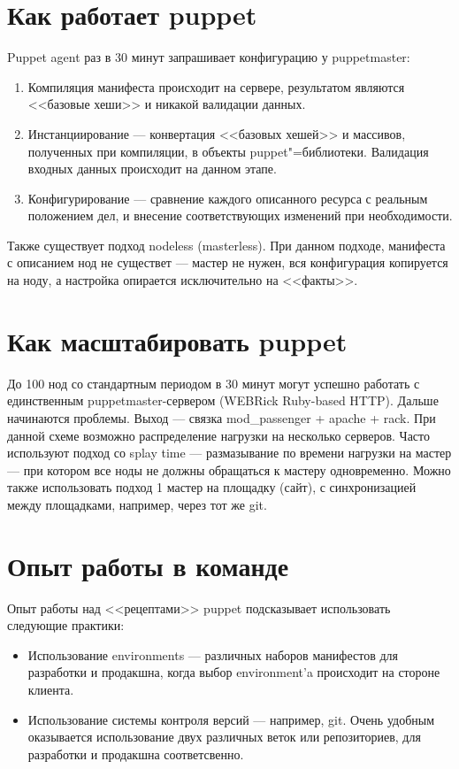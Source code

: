 \documentclass[10pt, a5paper]{article}
\begin{document}
\section*{Как работает puppet}

Puppet agent раз в 30 минут запрашивает конфигурацию у puppetmaster:

\begin{enumerate}
  \item Компиляция манифеста происходит на сервере, результатом являются <<базовые хеши>> и никакой валидации данных.
  \item Инстанциирование --- конвертация <<базовых хешей>> и массивов, полученных при компиляции, в объекты puppet"=библиотеки. Валидация входных данных происходит на данном этапе.
  \item Конфигурирование --- сравнение каждого описанного ресурса с реальным положением дел, и внесение соответствующих изменений при необходимости.
\end{enumerate}

Также существует подход nodeless (masterless). При данном подходе, манифеста с описанием нод не существет --- мастер не нужен, вся конфигурация копируется на ноду, а настройка опирается исключительно на <<факты>>.

\section*{Как масштабировать puppet}

До 100 нод со стандартным периодом в 30 минут могут успешно работать с единственным puppetmaster-сервером (WEBRick Ruby-based HTTP). Дальше начинаются проблемы. Выход --- связка mod\_passenger + apache + rack. При данной схеме возможно распределение нагрузки на несколько серверов. Часто используют подход со splay time --- размазывание по времени нагрузки на мастер --- при котором все ноды не должны обращаться к мастеру одновременно. Можно также использовать подход 1 мастер на площадку (сайт), с синхронизацией между площадками, например, через тот же git.

\section*{Опыт работы в команде}

Опыт работы над <<рецептами>> puppet подсказывает использовать следующие практики:

\begin{itemize}
  \item Использование environments --- различных наборов манифестов для разработки и продакшна, когда выбор environment’a происходит на стороне клиента.
  \item Использование системы контроля версий --- например, git. Очень удобным оказывается использование двух различных веток или репозиториев, для разработки и продакшна соответсвенно.
\end{itemize}
\end{document}
